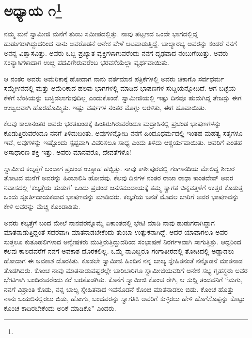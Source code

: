 
\chapter[ಅಧ್ಯಾಯ ೧]{ಅಧ್ಯಾಯ ೧\protect\footnote{}}

ನಮ್ಮ ಮನೆ ಸ್ವಾಮೀಜಿ ಮನೆಗೆ ತುಂಬ ಸಮೀಪದಲ್ಲಿತ್ತು. ನಾವು ಪಟ್ಟಣದ ಒಂದೇ ಭಾಗದಲ್ಲಿದ್ದ ಹುಡುಗರಾಗಿದ್ದುದರಿಂದ ನಾನು ಅವರೊಡನೆ ಅನೇಕ ವೇಳೆ ಆಟವಾಡುತ್ತಿದ್ದೆ. ಬಾಲ್ಯಾರಭ್ಯ ಅವರನ್ನು ಕಂಡರೆ ನನಗೆ ಅನನ್ಯ ವಿಶ್ವಾಸವಿತ್ತು. ಅವರು ಒಬ್ಬ ಪ್ರಖ್ಯಾತ ವ್ಯಕ್ತಿಗಳಾಗುವರೆಂದು ನನಗೆ ದೃಢವಾದ ನಂಬುಗೆಯಿತ್ತು. ಅವರು ಸಂನ್ಯಾಸಿಗಳಾದಾಗ ಉಚ್ಚ ಪದವಿಗೇರುವರೆಂಬ ಭರವಸೆಯೆಲ್ಲಾ ವ್ಯರ್ಥವಾಯಿತು.

ಆ ನಂತರ ಅವರು ಅಮೆರಿಕಾಕ್ಕೆ ಹೋದಾಗ ನಾನು ವರ್ತಮಾನ ಪತ್ರಿಕೆಗಳಲ್ಲಿ ಅವರು ಚಿಕಾಗೊ ಸರ್ವಧರ್ಮ ಸಮ್ಮೇಳನದಲ್ಲಿ ಮತ್ತು ಅಮೆರಿಕಾದ ಹಲವು ಭಾಗಗಳಲ್ಲಿ ಮಾಡಿದ ಭಾಷಣಗಳ ಸುದ್ದಿಯನ್ನೋದಿದೆ. ಆಗ ಬಟ್ಟೆಯ ಕೆಳಗೆ ಬೆಂಕಿಯನ್ನು ಬಚ್ಚಿಡಲಾಗುವುದಿಲ್ಲ ಎಂದುಕೊಂಡೆ. ಸ್ವಾಮೀಜಿಯಲ್ಲಿ ಇಷ್ಟು ದಿನವೂ ಹುದುಗಿದ್ದ ತೇಜಸ್ಸು ಈಗ ಉಜ್ವಲವಾಗಿ ಹೊರಹೊಮ್ಮಿತು. ಇಷ್ಟು ವರ್ಷಗಳ ನಂತರ ಮೊಗ್ಗು ಅರಳಿತು, ಈಗ ಹೂವಾಯಿತು.

ಕೆಲವು ಕಾಲಾನಂತರ ಅವರು ಭರತಖಂಡಕ್ಕೆ ಹಿಂತಿರುಗಿರುವರೆಂದೂ ಮದ್ರಾಸಿನಲ್ಲಿ ಪ್ರಚಂಡ ಭಾಷಣಗಳನ್ನು ಕೊಡುತ್ತಿರುವರೆಂದೂ ನನಗೆ ತಿಳಿದುಬಂತು. ಅವುಗಳನ್ನೋದಿ ನನಗೆ ಹಿಂದೂಧರ್ಮದಲ್ಲಿ ಇಂತಹ ಮಹತ್ವ ಸತ್ಯಗಳೂ ಇವೆ, ಅವುಗಳನ್ನು ಇಷ್ಟೊಂದು ಸ್ಪಷ್ಟವಾಗಿ ವಿವರಿಸಲೂ ಸಾಧ್ಯ ಎಂದು ತಿಳಿದು ಆಶ್ಚರ್ಯವಾಯಿತು. ಅವರಿಗೆ ಎಂತಹ ಅಸಾಧಾರಣ ಶಕ್ತಿ ಇತ್ತು. ಅವರು ಮಾನವರೊ, ದೇವತೆಗಳೊ!

ಸ್ವಾಮೀಜಿ ಕಲ್ಕತ್ತೆಗೆ ಬಂದಾಗ ಪ್ರಚಂಡ ಉತ್ಸಾಹ ಹಬ್ಬಿತ್ತು. ನಾವು ಕಾಶೀಪುರದಲ್ಲಿ ಗಂಗಾನದಿಯ ಮೇಲಿದ್ದ ಶೀಲರ ತೋಟದ ಮನೆಗೆ ಅವರನ್ನು ಹಿಂಬಾಲಿಸಿ ಹೋದೆವು. ಕೆಲವು ದಿನಗಳ ನಂತರ ರಾಜಾ ರಾಧಾ ಕಾಂತದೇವ್ ಅವರ ನಿವಾಸದಲ್ಲಿ ‘ಕಲ್ಕತ್ತೆಯ ಹುಡುಗ’ ಒಂದು ಪ್ರಚಂಡ ಜನಸಮುದಾಯಕ್ಕೆ ತಮ್ಮ ಸ್ವಾಗತ ಬಿನ್ನವತ್ತಳೆಗೆ ಉತ್ತರ ಕೊಡುತ್ತ ಒಂದು ಸ್ಪೂರ್ತಿದಾಯಕವಾದ ಭಾಷಣವನ್ನು ಮಾಡಿದರು. ಕಲ್ಕತ್ತೆಯ ಜನತೆ ಮೊದಲ ಬಾರಿಗೆ ಅವರ ಭಾಷಣವನ್ನು ಕೇಳಿ ಅವರನ್ನು ಮೆಚ್ಚಿ ಕೊಂಡಾಡಿತು.

ಅವರು ಕಲ್ಕತ್ತೆಗೆ ಬಂದ ಮೇಲೆ ನಾನವರನ್ನೊಮ್ಮೆ ಏಕಾಂತದಲ್ಲಿ ಭೇಟಿ ಮಾಡಿ ನಾವು ಹುಡುಗರಾಗಿದ್ದಾಗ ಮಾತನಾಡುತ್ತಿದ್ದಂತೆ ಸದರವಾಗಿ ಮಾತನಾಡಬೇಕೆಂದು ತುಂಬಾ ಉತ್ಸುಕನಾಗಿದ್ದೆ. ಆದರೆ ಯಾವಾಗಲೂ ಅವರ ಸುತ್ತಲೂ ಕುತೂಹಲಿಗಳಾದ ಅನ್ವೇಷಕರು ಮುತ್ತಿರುತ್ತಿದ್ದುದರಿಂದ ಸಂಭಾಷಣೆ ನಿರರ್ಗಳವಾಗಿ ಸಾಗುತ್ತಿತ್ತು. ಆದ್ದರಿಂದ ಕೆಲವು ಕಾಲದವರೆಗೆ ನನಗೆ ಅವಕಾಶ ದೊರಕಲಿಲ್ಲ. ಒಮ್ಮೆ ನಾವಿಬ್ಬರೂ ಗಂಗಾತೀರದಲ್ಲಿ ತೋಟದಲ್ಲಿ ಅಡ್ಡಾಡಲು ಹೋದಾಗ ಈ ಅವಕಾಶ ದೊರಕಿತು. ಕೂಡಲೇ ಸ್ವಾಮೀಜಿ ಹಿಂದಿನ ನನ್ನ ಬಾಲ್ಯ ಸ್ನೇಹಿತನಂತೆ ನನ್ನೊಡನೆ ಮಾತನಾಡ ತೊಡಗಿದರು. ಕೊಂಚ ನಾವು ಮಾತನಾಡುವಷ್ಟರಲ್ಲೇ ಬಾರಿಬಾರಿಗೂ ಸ್ವಾಮೀಜಿಯವರಿಗೆ ಅನೇಕ ಸಭ್ಯ ಗೃಹಸ್ಥರು ಅವರ ಭೇಟಿಗಾಗಿ ಬಂದಿರುವರೆಂದು ಕರೆ ಬರತೊಡಗಿತು. ಕೊನೆಗೆ ಸ್ವಾಮೀಜಿ ಕೊಂಚ ರೇಗಿ, ಆ ಸುದ್ದಿ ತಂದವನಿಗೆ “ಮಗು, ನನಗೆ ವಿಶ್ರಾಂತಿ ಕೊಡು, ನನ್ನ ಬಾಲ್ಯ ಸ್ನೇಹಿತನಾದ ಇವನೊಡನೆ ಕೊಂಚ ಮಾತನಾಡಲು ಬಿಡು. ಕೊಂಚ ಹೊತ್ತು ನಾನು ಬಯಲಿನಲ್ಲಿರಲು ಬಿಡು, ಹೋಗು, ಬಂದವರನ್ನು ಸ್ವಾಗತಿಸಿ ಅವರಿಗೆ ಕುಳ್ಳಿರಲು ಹೇಳಿ ಹೊಗೆಸೊಪ್ಪನ್ನು ಕೊಟ್ಟು ಕೊಂಚ ಕಾದಿರಬೇಕೆಂದು ಅರಿಕೆ ಮಾಡಿಕೊ” ಎಂದರು.

